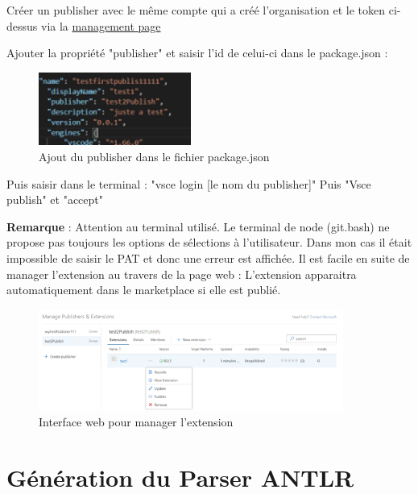 \documentclass[
    iict, %
    il, %
]{heig-tb}
\begin{document}
Créer un publisher avec le même compte qui a créé l'organisation et le token ci-dessus via la \href{https://marketplace.visualstudio.com/manage/publishers/}{management page}

Ajouter la propriété "publisher" et saisir l'id de celui-ci dans le package.json :

\begin{figure}[!ht]
    \begin{center}
        \includegraphics[width=5cm]{assets/figures/json-publisher.png}
    \end{center}
    \caption[Ajout du publisher dans le fichier package.json]{\label{json-publisher} Ajout du publisher dans le fichier package.json}
\end{figure}

Puis saisir dans le terminal : "vsce login [le nom du publisher]"
Puis "Vsce publish" et "accept"

\textbf{Remarque} : Attention au terminal utilisé. Le terminal de node (git.bash) ne propose pas toujours les options de sélections à l'utilisateur. Dans mon cas il était impossible de saisir le PAT et donc une erreur est affichée.
Il est facile en suite de manager l'extension au travers de la page web :
L'extension apparaitra automatiquement dans le marketplace si elle est publié.

\begin{figure}[!ht]
    \begin{center}
        \includegraphics[width=10cm]{assets/figures/manage-publisher.png}
    \end{center}
    \caption[Interface web pour manager l'extension]{\label{manage-publisher} Interface web pour manager l'extension}
\end{figure}


\section{Génération du Parser ANTLR}
\end{document}
